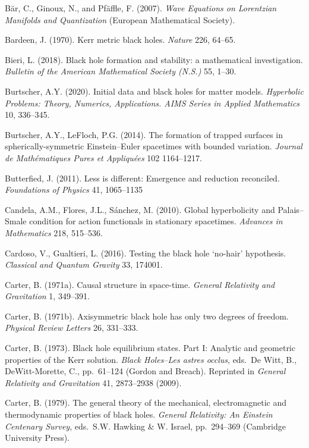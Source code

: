 \documentclass[12pt]{article}
\begin{document}
\begin{small}
\begin{thebibliography}{99}
\item[]  B\"{a}r, C., Ginoux, N., and Pf\"{a}ffle, F. (2007). \emph{Wave Equations on Lorentzian Manifolds and Quantization}
(European Mathematical Society). 
\item[]  Bardeen, J. (1970). Kerr metric black holes. \emph{Nature} 226, 64--65.
\item[] Bieri, L. (2018). Black hole formation and stability: a mathematical investigation. \emph{Bulletin of the American Mathematical Society (N.S.)} 55, 1--30.
\item[] Burtscher, A.Y. (2020). Initial data and black holes for matter models. \emph{
Hyperbolic Problems: Theory, Numerics, Applications. AIMS Series in  Applied Mathematics}  10, 336--345.
\item[] Burtscher, A.Y.,  LeFloch, P.G. (2014). The formation of trapped surfaces in spherically-symmetric Einstein--Euler
spacetimes with bounded variation. \emph{Journal de Math\'{e}matiques Pures et Appliqu\'{e}es} 102 1164--1217.
\item[] Butterfied, J. (2011). Less is different: Emergence and reduction reconciled.
\emph{Foundations of Physics}  41, 1065--1135
\item[]  Candela, A.M.,  Flores, J.L., S\'{a}nchez, M.  (2010).
Global hyperbolicity and Palais--Smale condition for action functionals in stationary spacetimes.
\emph{Advances in Mathematics} 218, 515--536.
\item[]  Cardoso, V.,  Gualtieri, L. (2016). Testing the black hole `no-hair' hypothesis. \emph{Classical and Quantum Gravity}
33, 174001.
\item[] Carter, B. (1971a). Causal structure in space-time. \emph{General Relativity and Gravitation} 1, 349--391.
\item[] Carter, B. (1971b). Axisymmetric black hole has only two degrees of freedom. \emph{Physical Review
Letters} 26, 331--333.
\item[] Carter, B. (1973). Black hole equilibrium states. Part I: Analytic and geometric properties of the Kerr solution.
\emph{Black Holes--Les astres occlus}, eds.\  De Witt, B., DeWitt-Morette, C., pp.\ 61--124 (Gordon and Breach).
Reprinted in \emph{General Relativity and Gravitation} 41, 2873--2938 (2009).
\item[] Carter, B. (1979). The general theory of the mechanical, electromagnetic and thermodynamic properties of black holes.  \emph{General Relativity: An Einstein Centenary Survey}, eds.\ 
S.W. Hawking \& W. Israel, pp.\ 294--369 (Cambridge University Press). 

\end{thebibliography}
\end{small}
\end{document}
